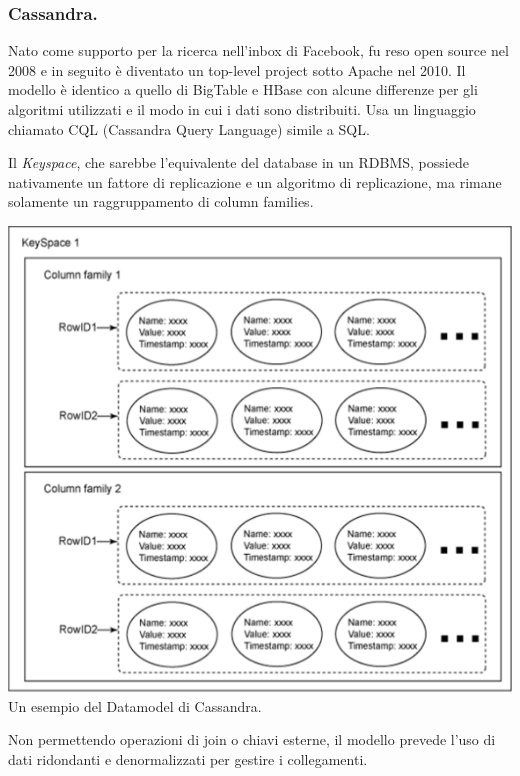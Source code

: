 \documentclass[a4page, 11pt]{article}
\begin{document}
\subsubsection*{Cassandra.}
Nato come supporto per la ricerca nell'inbox di Facebook, fu reso open source nel 2008 e in seguito è diventato un top-level project sotto Apache nel 2010.
Il modello è identico a quello di BigTable e HBase con alcune differenze per gli algoritmi utilizzati e il modo in cui i dati sono distribuiti.
Usa un linguaggio chiamato CQL (Cassandra Query Language) simile a SQL.

Il \textit{Keyspace}, che sarebbe l'equivalente del database in un RDBMS, possiede nativamente un fattore di replicazione e un algoritmo di replicazione, ma rimane solamente un raggruppamento di column families.
\begin{center}
	\includegraphics[scale=0.5]{IMAGE5.png} \newline
	Un esempio del Datamodel di Cassandra.
\end{center}

Non permettendo operazioni di join o chiavi esterne, il modello prevede l'uso di dati ridondanti e denormalizzati per gestire i collegamenti.
\end{document}
